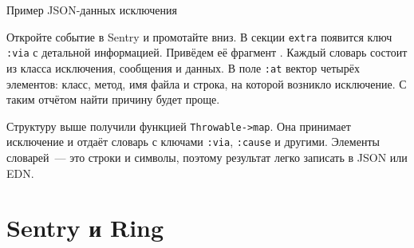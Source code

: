 \begin{listing}[ht!]

\ifx\devicetype\mobile

\begin{english}
  \begin{json}
  \end{json}
\end{english}

\else

\begin{english}
  \begin{json}
  \end{json}
\end{english}

\fi

  \caption{Пример JSON-данных исключения}
  \label{fig:ex-json-data}
\end{listing}

Откройте событие в Sentry и промотайте вниз. В секции \verb|extra| появится ключ
\verb|:via| с детальной информацией. Привёдем её фрагмент .
Каждый словарь состоит из класса исключения, сообщения и данных. В поле \verb|:at|
вектор четырёх элементов: класс, метод, имя файла и строка, на которой возникло
исключение. С таким отчётом найти причину будет проще.


Структуру выше получили функцией \texttt{Throw\-able->map}. Она принимает
исключение и отдаёт словарь с ключами \verb|:via|, \verb|:cause| и
другими. Элементы словарей~--- это строки и символы, поэтому результат легко
записать в JSON или EDN.

\section{Sentry и Ring}

